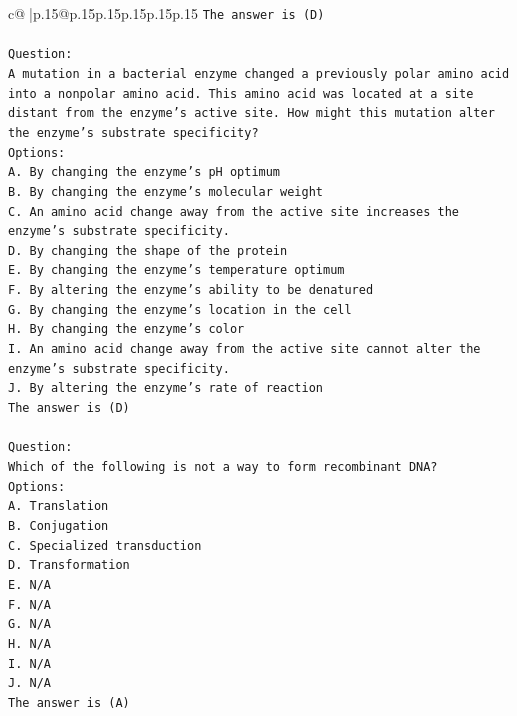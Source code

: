 \documentclass{article}
\begin{document}
{\begin{supertabular}{c@{$\;$}|p{.15\linewidth}@{}p{.15\linewidth}p{.15\linewidth}p{.15\linewidth}p{.15\linewidth}p{.15\linewidth}}
{{{\texttt{The answer is (D)} \\
\\ 
\texttt{Question:} \\
\texttt{A mutation in a bacterial enzyme changed a previously polar amino acid into a nonpolar amino acid. This amino acid was located at a site distant from the enzyme’s active site. How might this mutation alter the enzyme’s substrate specificity?} \\
\texttt{Options:} \\
\texttt{A. By changing the enzyme’s pH optimum} \\
\texttt{B. By changing the enzyme's molecular weight} \\
\texttt{C. An amino acid change away from the active site increases the enzyme's substrate specificity.} \\
\texttt{D. By changing the shape of the protein} \\
\texttt{E. By changing the enzyme's temperature optimum} \\
\texttt{F. By altering the enzyme's ability to be denatured} \\
\texttt{G. By changing the enzyme’s location in the cell} \\
\texttt{H. By changing the enzyme's color} \\
\texttt{I. An amino acid change away from the active site cannot alter the enzyme’s substrate specificity.} \\
\texttt{J. By altering the enzyme's rate of reaction} \\
\texttt{The answer is (D)} \\
\\ 
\texttt{Question:} \\
\texttt{Which of the following is not a way to form recombinant DNA?} \\
\texttt{Options:} \\
\texttt{A. Translation} \\
\texttt{B. Conjugation} \\
\texttt{C. Specialized transduction} \\
\texttt{D. Transformation} \\
\texttt{E. N/A} \\
\texttt{F. N/A} \\
\texttt{G. N/A} \\
\texttt{H. N/A} \\
\texttt{I. N/A} \\
\texttt{J. N/A} \\
\texttt{The answer is (A)} \\
}}}
\end{supertabular}}
\end{document}
